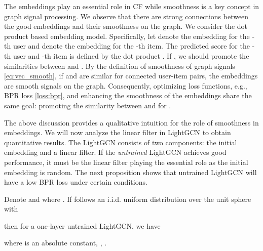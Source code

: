 \documentclass[sigconf]{acmart}
\begin{document}
The embeddings play an essential role in CF while smoothness is a key concept in graph signal processing. We observe that there are strong connections between the good embeddings and their smoothness on the graph. We consider the dot product based embedding model. Specifically, let  denote the embedding for the -th user and  denote the embedding for the -th item. The predicted score for the -th user and -th item is defined by the dot product . If , we should promote the similarities between  and . By the definition of smoothness of graph signals \eqref{eq:vec_smooth}, if  and  are similar for connected user-item pairs, the embeddings are smooth signals on the graph. Consequently, optimizing loss functions, e.g., BPR loss \eqref{loss:bpr}, and enhancing the smoothness of the embeddings share the same goal: promoting the similarity between  and  for . 

The above discussion provides a qualitative intuition for the role of smoothness in embeddings. We will now analyze the linear filter in LightGCN to obtain quantitative results. The LightGCN consists of two components: the initial embedding and a linear filter. If the \emph{untrained} LightGCN achieves good performance, it must be the linear filter playing the essential role as the initial embedding is random. The next proposition shows that untrained LightGCN will have a low BPR loss under certain conditions. 


\begin{theorem} \label{prop:untrain}
    Denote  and  where . If  follows an i.i.d. uniform distribution over the unit sphere with
    
    then for a one-layer untrained LightGCN, we have
    
    where  is an absolute constant, , .
\end{theorem}
\end{document}
